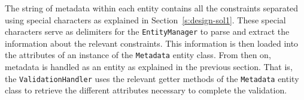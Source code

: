 The string of metadata within each entity contains all the constraints
 separated using special characters as explained in Section~\ref{s:design-sol1}.
These special characters serve as delimiters for the \texttt{EntityManager} to
parse and extract the information about the relevant constraints. This
information is then loaded  into the attributes of  an instance of the
\texttt{Metadata} entity class. From then on, metadata is handled as an entity
as explained in the previous section. That is, the \texttt{ValidationHandler}
uses the relevant getter methods of the \texttt{Metadata} entity class to
retrieve  the different attributes necessary to complete the validation.

















